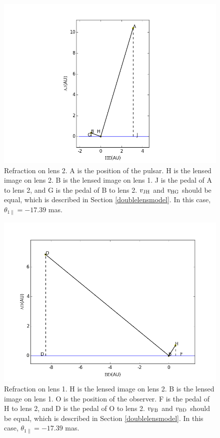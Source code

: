 \documentclass[useAMS,usenatbib]{mn2e}
\begin{document}
\begin{figure}
\centering
\includegraphics[width=1.0\linewidth,scale=1.0]{First_reflection.png}
\caption{Refraction on lens 2. 
A is the position of the pulsar. H is the lensed image on lens 2. B is the lensed image on lens 1. J is the pedal of A to lens 2, and G is the pedal of B to lens 2. $v_{\rm JH}$ and $v_{\rm HG}$ should be equal, which is described in Section \ref{doublelensmodel}. In this case, $\theta_{1\parallel} =-17.39$ mas.}
\label{first_reflect}
\end{figure}

\begin{figure}
\centering
\includegraphics[width=1.0\linewidth]{Second_reflection.png}
\caption{Refraction on lens 1. 
H is the lensed image on lens 2. B is the lensed image on lens 1. O is the position of the observer. F is the pedal of H to lens 2, and D is the pedal of O to lens 2. $v_{\rm FB}$ and $v_{\rm BD}$ should be equal, which is described in Section \ref{doublelensmodel}. In this case, $\theta_{1\parallel} = -17.39$ mas. }
\label{second_reflect}
\end{figure}
\end{document}
